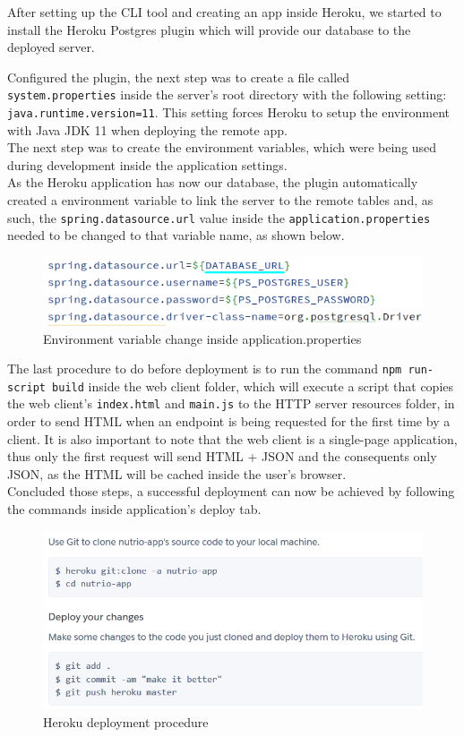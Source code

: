 After setting up the CLI tool and creating an app inside Heroku, we started to install the Heroku Postgres plugin which will provide our database to the
deployed server.

Configured the plugin, the next step was to create a file called \texttt{system.properties} inside
the server's root directory with the following setting: \texttt{java.runtime.version=11}. This setting forces Heroku to setup the
environment with Java JDK 11 when deploying the remote app.\\

The next step was to create the environment variables, which were being used during development inside the 
application settings.\\

As the Heroku application has now our database, the plugin automatically created a environment variable to link the server to the remote
tables and, as such, the \texttt{spring.datasource.url} value inside the \texttt{application.properties} needed to be changed to that 
variable name, as shown below.\\

\begin{figure}[H]
    \begin{center}
        \includegraphics[scale=0.5]{_figures/heroku-env-db.png}
        \caption{Environment variable change inside application.properties} 
    \end{center}
\end{figure}

The last procedure to do before deployment is to run the command \texttt{npm run-script build}
inside the web client folder, which will execute a script that copies the web client's 
\texttt{index.html} and \texttt{main.js} to the HTTP server resources folder, in order to 
send HTML when an endpoint is being requested for the first time by a client. It is also important
to note that the web client is a single-page application, thus only the first request will send
HTML + JSON and the consequents only JSON, as the HTML will be cached inside the user's browser.\\

Concluded those steps, a successful deployment can now be achieved by following the commands inside
application's deploy tab.

\begin{figure}[H]
    \begin{center}
        \includegraphics[scale=0.6]{_figures/Heroku-deployment.png}
        \caption{Heroku deployment procedure} 
    \end{center}
\end{figure}


